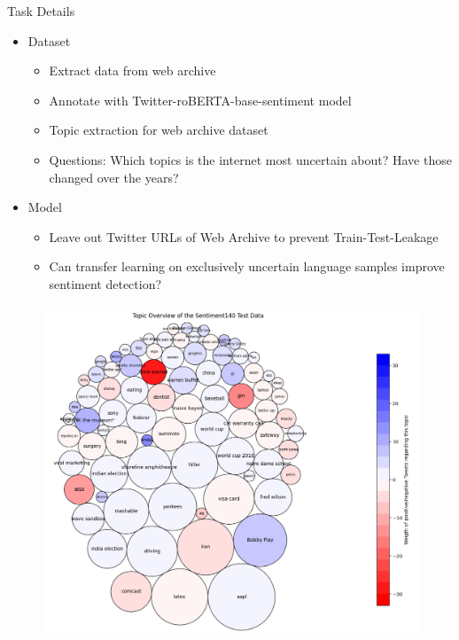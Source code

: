 \documentclass{beamer}
\begin{document}
\begin{frame}{Task Details}
	\begin{itemize}
		\item Dataset
		\begin{itemize}
			\setlength\itemsep{5pt}
			\item Extract data from web archive
			\item Annotate with Twitter-roBERTA-base-sentiment model\footnotemark
			\item Topic extraction for web archive dataset
			\item Questions: Which topics is the internet most uncertain about? Have those changed over the years?
		\end{itemize}
		\item Model
		\begin{itemize}
			\setlength\itemsep{5pt}
			\item Leave out Twitter URLs of Web Archive to prevent Train-Test-Leakage
			\item Can transfer learning on exclusively uncertain language samples improve sentiment detection?
		\end{itemize}
	\end{itemize}
\end{frame}

\begin{frame}
	\begin{figure}
		\centering
		\includegraphics[scale=0.31]{Sent140TestData.png}
	\end{figure}
\end{frame}
\end{document}
